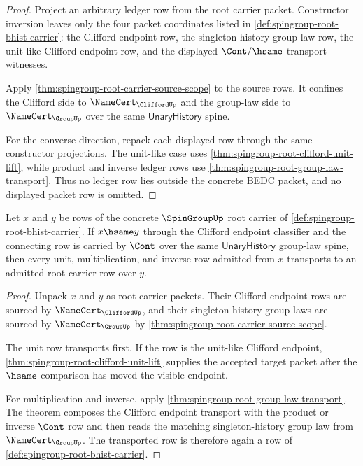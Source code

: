 \begin{proof}
Project an arbitrary ledger row from the root carrier packet. Constructor inversion leaves only the four packet coordinates listed in \autoref{def:spingroup-root-bhist-carrier}: the Clifford endpoint row, the singleton-history group-law row, the unit-like Clifford endpoint row, and the displayed $\Cont/\hsame$ transport witnesses.

Apply \autoref{thm:spingroup-root-carrier-source-scope} to the source rows. It confines the Clifford side to $\NameCert_{\CliffordUp}$ and the group-law side to $\NameCert_{\GroupUp}$ over the same $\mathsf{UnaryHistory}$ spine.

For the converse direction, repack each displayed row through the same constructor projections. The unit-like case uses \autoref{thm:spingroup-root-clifford-unit-lift}, while product and inverse ledger rows use \autoref{thm:spingroup-root-group-law-transport}. Thus no ledger row lies outside the concrete BEDC packet, and no displayed packet row is omitted.
\end{proof}

\begin{theorem}
\label{thm:spingroup-root-transport-closure}
Let $x$ and $y$ be rows of the concrete $\SpinGroupUp$ root carrier of \autoref{def:spingroup-root-bhist-carrier}. If $x\hsame y$ through the Clifford endpoint classifier and the connecting row is carried by $\Cont$ over the same $\mathsf{UnaryHistory}$ group-law spine, then every unit, multiplication, and inverse row admitted from $x$ transports to an admitted root-carrier row over $y$.
\end{theorem}
\begin{proof}
Unpack $x$ and $y$ as root carrier packets. Their Clifford endpoint rows are sourced by $\NameCert_{\CliffordUp}$, and their singleton-history group laws are sourced by $\NameCert_{\GroupUp}$ by \autoref{thm:spingroup-root-carrier-source-scope}.

The unit row transports first. If the row is the unit-like Clifford endpoint, \autoref{thm:spingroup-root-clifford-unit-lift} supplies the accepted target packet after the $\hsame$ comparison has moved the visible endpoint.

For multiplication and inverse, apply \autoref{thm:spingroup-root-group-law-transport}. The theorem composes the Clifford endpoint transport with the product or inverse $\Cont$ row and then reads the matching singleton-history group law from $\NameCert_{\GroupUp}$. The transported row is therefore again a row of \autoref{def:spingroup-root-bhist-carrier}.
\end{proof}

